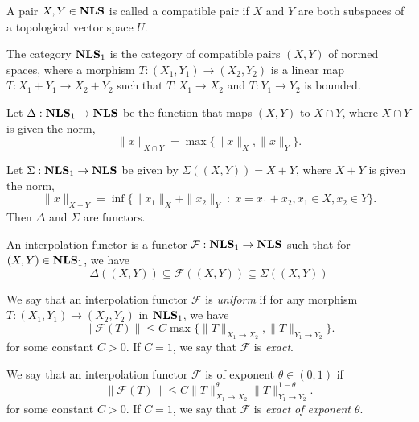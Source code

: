 \begin{definition}
    A pair $X,Y \in \mathrm{\mathbf{NLS}}$ is called a compatible pair if $X$ and $Y$
    are both subspaces of a topological vector space $U$.
\end{definition}

\begin{definition}
    The category $\mathrm{\mathbf{NLS}}_1$ is the category of compatible pairs $(X,Y)$ of
    normed spaces, where a morphism $T:(X_1,Y_1)\rightarrow (X_2,Y_2)$
    is a linear map $T:X_1+Y_1\rightarrow X_2+Y_2$ such that $T:X_1\rightarrow X_2$
    and $T:Y_1\rightarrow Y_2$ is bounded.
\end{definition}

\begin{proposition}
    Let $\Delta:\mathrm{\mathbf{NLS}}_1\rightarrow\mathrm{\mathbf{NLS}}$ be the function that maps $(X,Y)$
    to $X\cap Y$, where $X \cap Y$ is given the norm,
    \begin{equation*}
        \|x\|_{X \cap Y} = \max\{\|x\|_X,\|x\|_Y\}.
    \end{equation*}
        
    Let $\Sigma:\mathrm{\mathbf{NLS}}_1\rightarrow\mathrm{\mathbf{NLS}}$ be given by $\Sigma((X,Y)) = X+Y$,
    where $X+Y$
    is given the norm,
    \begin{equation*}
        \|x\|_{X+Y} = \inf\{ \|x_1\|_X+\|x_2\|_Y \;:\;x = x_1+x_2,x_1 \in X,x_2 \in Y\}.
    \end{equation*}
    Then $\Delta$ and $\Sigma$ are functors. 
\end{proposition}

\begin{definition}
    An interpolation functor is a functor $\mathcal{F}:\mathrm{\mathbf{NLS}}_1\rightarrow\mathrm{\mathbf{NLS}}$
    such that for $(X,Y) \in \mathrm{\mathbf{NLS}}_1$, we have 
    \begin{equation*}
        \Delta((X,Y)) \subseteq \mathcal{F}((X,Y)) \subseteq \Sigma((X,Y))
    \end{equation*}


We say that an interpolation functor $\mathcal{F}$
is \emph{uniform} if for any morphism $T:(X_1,Y_1)\rightarrow (X_2,Y_2)$ in $\mathrm{\mathbf{NLS}}_1$,
we have
\begin{equation*}
    \|\mathcal{F}(T)\| \leq C\max\{\|T\|_{X_1\rightarrow X_2},\|T\|_{Y_1\rightarrow Y_2}\}.
\end{equation*}
for some constant $C > 0$. If $C = 1$, we say that $\mathcal{F}$ is \emph{exact}.

We say that an interpolation functor $\mathcal{F}$ is of exponent $\theta \in (0,1)$
if
\begin{equation*}
    \|\mathcal{F}(T)\| \leq C\|T\|_{X_1\rightarrow X_2}^\theta \|T\|_{Y_1\rightarrow Y_2}^{1-\theta}.
\end{equation*}
for some constant $C > 0$. If $C = 1$, we say that $\mathcal{F}$ is \emph{exact
of exponent $\theta$}.

\end{definition}

